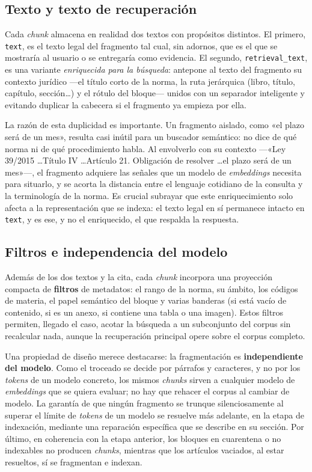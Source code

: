 \subsection{Texto y texto de recuperación}
\label{subsec:text-vs-retrieval}

Cada \emph{chunk} almacena en realidad dos textos con propósitos distintos. El primero, \texttt{text}, es el texto legal del fragmento tal cual, sin adornos, que es el que se mostraría al usuario o se entregaría como evidencia. El segundo, \texttt{retrieval\_text}, es una variante \emph{enriquecida para la búsqueda}: antepone al texto del fragmento su contexto jurídico —el título corto de la norma, la ruta jerárquica (libro, título, capítulo, sección\ldots) y el rótulo del bloque— unidos con un separador inteligente y evitando duplicar la cabecera si el fragmento ya empieza por ella.

La razón de esta duplicidad es importante. Un fragmento aislado, como «el plazo será de un mes», resulta casi inútil para un buscador semántico: no dice de qué norma ni de qué procedimiento habla. Al envolverlo con su contexto —«Ley 39/2015 \ldots Título IV \ldots Artículo 21. Obligación de resolver \ldots el plazo será de un mes»—, el fragmento adquiere las señales que un modelo de \emph{embeddings} necesita para situarlo, y se acorta la distancia entre el lenguaje cotidiano de la consulta y la terminología de la norma. Es crucial subrayar que este enriquecimiento solo afecta a la representación que se indexa: el texto legal en sí permanece intacto en \texttt{text}, y es ese, y no el enriquecido, el que respalda la respuesta.

\subsection{Filtros e independencia del modelo}
\label{subsec:chunking-filtros}

Además de los dos textos y la cita, cada \emph{chunk} incorpora una proyección compacta de \textbf{filtros} de metadatos: el rango de la norma, su ámbito, los códigos de materia, el papel semántico del bloque y varias banderas (si está vacío de contenido, si es un anexo, si contiene una tabla o una imagen). Estos filtros permiten, llegado el caso, acotar la búsqueda a un subconjunto del corpus sin recalcular nada, aunque la recuperación principal opere sobre el corpus completo.

Una propiedad de diseño merece destacarse: la fragmentación es \textbf{independiente del modelo}. Como el troceado se decide por párrafos y caracteres, y no por los \emph{tokens} de un modelo concreto, los mismos \emph{chunks} sirven a cualquier modelo de \emph{embeddings} que se quiera evaluar; no hay que rehacer el corpus al cambiar de modelo. La garantía de que ningún fragmento se trunque silenciosamente al superar el límite de \emph{tokens} de un modelo se resuelve más adelante, en la etapa de indexación, mediante una reparación específica que se describe en su sección. Por último, en coherencia con la etapa anterior, los bloques en cuarentena o no indexables no producen \emph{chunks}, mientras que los artículos vaciados, al estar resueltos, sí se fragmentan e indexan.

